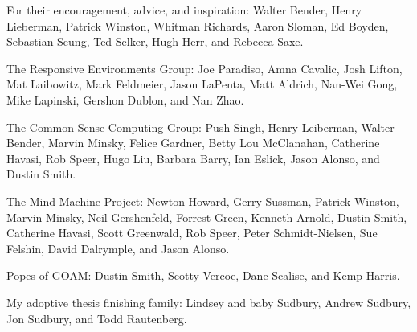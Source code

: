 \vspace{5mm}

\noindent For their encouragement, advice, and inspiration:
Walter Bender,
Henry Lieberman,
Patrick Winston,
Whitman Richards,
Aaron Sloman,
Ed Boyden,
Sebastian Seung,
Ted Selker,
Hugh Herr, and
Rebecca Saxe.

\vspace{5mm}

\noindent The Responsive Environments Group:
Joe Paradiso,
Amna Cavalic,
Josh Lifton, %
Mat Laibowitz, %
Mark Feldmeier, %
Jason LaPenta,
Matt Aldrich, %
Nan-Wei Gong, %
Mike Lapinski, %
Gershon Dublon,
and Nan Zhao. %

\vspace{5mm}

\noindent The Common Sense Computing Group:
Push Singh,
Henry Leiberman,
Walter Bender,
Marvin Minsky,
Felice Gardner,
Betty Lou McClanahan,
Catherine Havasi,
Rob Speer,
Hugo Liu,
Barbara Barry,
Ian Eslick,
Jason Alonso, and
Dustin Smith.

\vspace{5mm}

\noindent The Mind Machine Project:
Newton Howard, Gerry Sussman, Patrick Winston, Marvin Minsky, Neil Gershenfeld, Forrest Green, Kenneth Arnold, Dustin Smith, Catherine Havasi, Scott Greenwald, Rob Speer, Peter Schmidt-Nielsen, Sue Felshin, David Dalrymple, and Jason Alonso.

\vspace{5mm}

\noindent Popes of GOAM:
Dustin Smith,
Scotty Vercoe,
Dane Scalise, and
Kemp Harris.

\vspace{5mm}

\noindent My adoptive thesis finishing family:
Lindsey and baby Sudbury, Andrew Sudbury, Jon Sudbury, and Todd Rautenberg.

\vspace{5mm}

